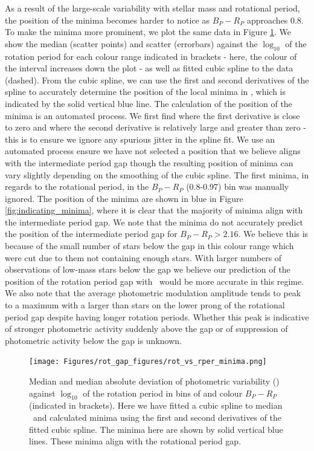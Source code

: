 As a result of the large-scale variability with stellar mass and rotational period, the position of the minima becomes harder to notice as $B_P - R_P$ approaches 0.8.
To make the minima more prominent, we plot the same data in Figure \ref{fig:binned_rper_scatter}.
We show the median \rper{} (scatter points) and scatter (errorbars) against the $\log_{10}$ of the rotation period for each colour range indicated in brackets - here, the colour of the interval increases down the plot - as well as fitted cubic spline to the data (dashed).
From the cubic spline, we can use the first and second derivatives of the spline to accurately determine the position of the local minima in \rper{}, which is indicated by the solid vertical blue line.
The calculation of the position of the minima is an automated process.
We first find where the first derivative is close to zero and where the second derivative is relatively large and greater than zero - this is to ensure we ignore any spurious jitter in the spline fit.
We use an automated process ensure we have not selected a position that we believe aligns with the intermediate period gap though the resulting position of minima can vary slightly depending on the smoothing of the cubic spline.
The first minima, in regards to the rotational period, in the $B_P-R_P$ (0.8-0.97) bin was manually ignored.
The position of the minima are shown in blue in Figure \ref{fig:indicating_minima}, where it is clear that the majority of minima align with the intermediate period gap.
We note that the minima do not accurately predict the position of the intermediate period gap for $B_P-R_P> 2.16$.
We believe this is because of the small number of stars below the gap in this colour range which were cut due to them not containing enough stars.
 With larger numbers of observations of low-mass stars below the gap we believe our prediction of the position of the rotation period gap with \rper{} \ would be more accurate in this regime. 
We also note that the average photometric modulation amplitude tends to peak to a maximum with a larger \rper{} than stars on the lower prong of the rotational period gap despite having longer rotation periods.
Whether this peak is indicative of stronger photometric activity suddenly above the gap or of suppression of photometric activity below the gap is unknown.

\begin{figure}
\centering
    \texttt{[image: Figures/rot\_gap\_figures/rot\_vs\_rper\_minima.png]}
    \caption{
    Median and median absolute deviation of photometric variability (\rper{}) against $\log_10$ of the rotation period in bins of and colour \gaia{} $B_P-R_P$ (indicated in brackets). Here we have fitted a cubic spline to median \rper{} \ and calculated minima using the first and second derivatives of the fitted cubic spline. The minima here are shown by solid vertical blue lines. These minima align with the rotational period gap.}
    \label{fig:binned_rper_scatter}
\end{figure}

